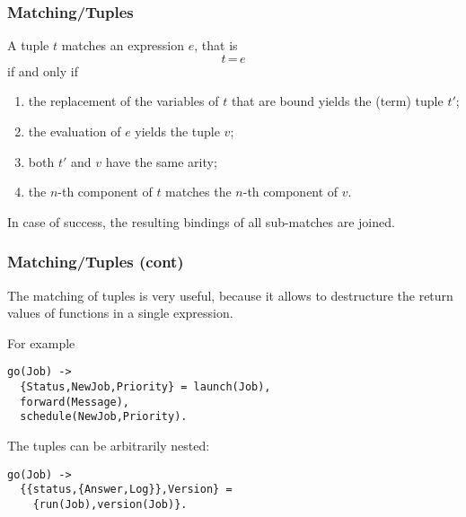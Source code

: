 %
\begin{frame}
\frametitle{Matching/Tuples}

\label{tuple_matching}

A tuple \(t\) matches an expression \(e\), that is
\[
t \, \texttt{=} \, e
\]
if and only if
\begin{enumerate}

  \item the replacement of the variables of \(t\) that are bound
    yields the (term) tuple \(t'\);

  \item the evaluation of \(e\) yields the tuple \(v\);

  \item both \(t'\) and \(v\) have the same arity;

  \item the \(n\)-th component of \(t\) matches the \(n\)-th component
    of \(v\).
  
\end{enumerate}
In case of success, the resulting bindings of all sub-matches are
joined.

\end{frame}

%
\begin{frame}[containsverbatim]
\frametitle{Matching/Tuples (cont)}

The matching of tuples is very useful, because it allows to
destructure the return values of functions in a single expression.

\bigskip

For example
\begin{verbatim}
go(Job) ->
  {Status,NewJob,Priority} = launch(Job),
  forward(Message),
  schedule(NewJob,Priority).
\end{verbatim}
The tuples can be arbitrarily nested:
\begin{verbatim}
go(Job) ->
  {{status,{Answer,Log}},Version} = 
    {run(Job),version(Job)}.
\end{verbatim}

\end{frame}

